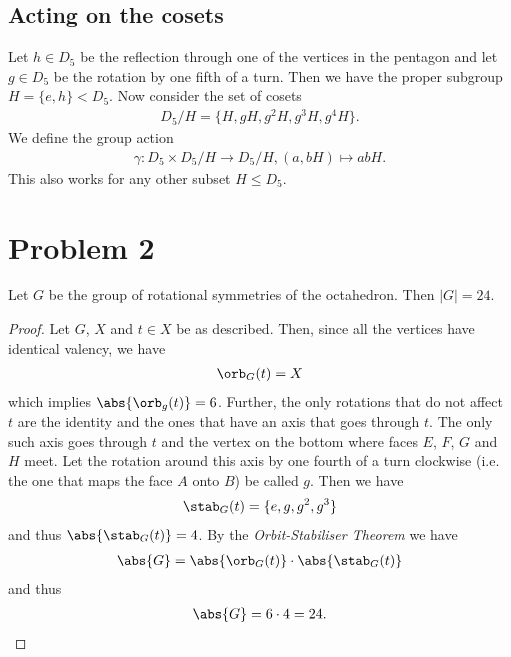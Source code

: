 \documentclass{article}
\begin{document}
\subsection*{Acting on the cosets}

Let $h\in D_5$ be the reflection through one of the vertices in the pentagon
and let $g\in D_5$ be the rotation by one fifth of a turn.
Then we have the proper subgroup $H=\{e, h\}<D_5$. Now consider the set of
cosets
\begin{align*}
    D_5/H=\{H, gH, g^2H, g^3H, g^4H\}.
\end{align*}
We define the group action
\begin{align*}
    \gamma: D_5\times D_5/H\to D_5/H,(a, bH)\mapsto abH.
\end{align*}
This also works for any other subset $H\leq D_5$.

\section*{Problem 2}

\begin{claim*}
    Let $G$ be the group of rotational symmetries of the octahedron. Then
    $|G|=24$.
\end{claim*}

\begin{proof}
    Let $G$, $X$ and $t\in X$ be as described. Then, since all the vertices
    have identical valency, we have
    \begin{align*}
        \orb_G(t) = X
    \end{align*}
    which implies $\abs{\orb_g(t)} = 6$. Further, the only rotations that
    do not affect $t$ are the identity and the ones that have an axis that
    goes through $t$. The only such axis goes through $t$ and the vertex on
    the bottom where faces $E$, $F$, $G$ and $H$ meet. Let the rotation
    around this axis by one fourth of a turn clockwise (i.e. the one that
    maps the face $A$ onto $B$) be called $g$. Then we have
    \begin{align*}
        \stab_G(t) = \{e, g, g^2, g^3\}
    \end{align*}
    and thus $\abs{\stab_G(t)} = 4$. By the \emph{Orbit-Stabiliser Theorem}
    we have
    \begin{align*}
        \abs{G} = \abs{\orb_G(t)}\cdot \abs{\stab_G(t)}
    \end{align*}
    and thus
    \begin{align*}
        \abs{G} = 6 \cdot 4 = 24.
    \end{align*}
\end{proof}
\end{document}
